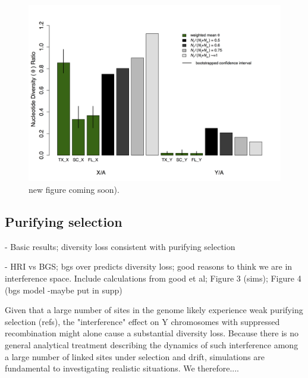 \documentclass[9pt,twocolumn,twoside]{gsajnl}
\begin{document}

\begin{figure}[htbp]
\centering
\noindent
\includegraphics[width=\linewidth]{figure2.jpg}
\caption{new figure coming soon).
}
\label{fig:spectrum}
\end{figure}

\subsection*{Purifying selection}

- Basic results; diversity loss consistent with purifying selection

- HRI vs BGS; bgs over predicts diversity loss; good reasons to think we are in interference space. Include calculations from good et al; Figure 3 (sims); Figure 4 (bgs model -maybe put in supp)

Given that a large number of sites in the genome likely experience weak purifying selection (\X refs), the "interference" effect on Y chromosomes with suppressed recombination might alone cause a substantial diversity loss. Because there is no general analytical treatment describing the dynamics of such interference among a large number of linked sites under selection and drift, simulations are fundamental to investigating realistic situations. We therefore....
\end{document}
